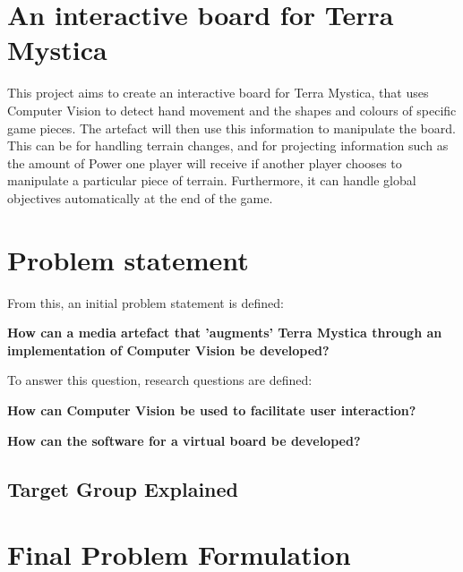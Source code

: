 \section{An interactive board for Terra Mystica}
This project aims to create an interactive board for Terra Mystica, that uses Computer Vision to detect hand movement and the shapes and colours of specific game pieces. The artefact will then use this information to manipulate the board. This can be for handling terrain changes, and for projecting information such as the amount of Power one player will receive if another player chooses to manipulate a particular piece of terrain. Furthermore, it can handle global objectives automatically at the end of the game.

\section{Problem statement}
From this, an initial problem statement is defined: 

\textbf{How can a media artefact that 'augments' Terra Mystica through an implementation of Computer Vision be developed?}

To answer this question, research questions are defined:

\textbf{How can Computer Vision be used to facilitate user interaction?}

\textbf{How can the software for a virtual board be developed?}

\subsection{Target Group Explained}

\section{Final Problem Formulation}\label{sec:finalprob}

